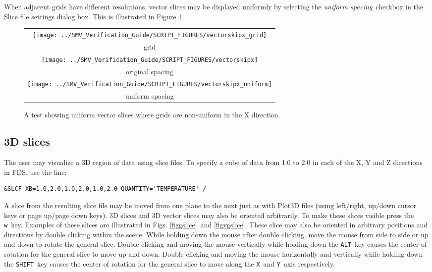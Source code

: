 \documentclass[11pt,twoside]{book}
\begin{document}
When adjacent grids have different resolutions, vector slices may be displayed uniformly
by selecting the {\em uniform spacing}\ checkbox in the Slice file settings dialog box.
This is illustrated in Figure \ref{figvsliceuniformx}.

\begin{figure}[bph]
\begin{center}
\begin{tabular}{c}
 \texttt{[image: ../SMV\_Verification\_Guide/SCRIPT\_FIGURES/vectorskipx\_grid]}\\
 grid\\
 \texttt{[image: ../SMV\_Verification\_Guide/SCRIPT\_FIGURES/vectorskipx]}\\
 original spacing\\
 \texttt{[image: ../SMV\_Verification\_Guide/SCRIPT\_FIGURES/vectorskipx\_uniform]}\\
 uniform spacing
 \end{tabular}
\end{center}
 \caption[A test showing uniform vector slices where grids are non-uniform in the X direction.]
{A test showing uniform vector slices where grids are non-uniform in the X direction.}
\label{figvsliceuniformx}%
\end{figure}


\subsection{3D slices}
The user may visualize a 3D region of data using slice files.
To specify a cube of data from 1.0 to 2.0 in each
of the X, Y and Z directions in FDS, use the line:
\begin{lstlisting}
&SLCF XB=1.0,2.0,1.0,2.0,1.0,2.0 QUANTITY='TEMPERATURE' /
\end{lstlisting}

A slice from the resulting slice file
may be moved from one plane to the next just as with Plot3D
files (using left/right, up/down cursor keys or page up/page down
keys).  3D slices and 3D vector slices may also be oriented arbitrarily.
To make these slices visible press the {\tt w}\ key.  Examples of
these slices are illustrated in Figs. \ref{figgslice}\ and \ref{figvgslice}.
These slice may also be oriented in arbitrary positions and directions by
double clicking within the scene.  While holding down the mouse after double clicking,
move the mouse from
side to side or up and down to rotate the general slice.  Double clicking and moving
the mouse vertically while holding down the {\tt ALT}\
key causes the center of rotation for the general slice to move up and down.
Double clicking and moving the mouse horizontally and vertically while holding down
the {\tt SHIFT}\ key causes the center of rotation for the general slice to move along
the {\tt X}\ and {\tt Y}\ axis respectively.
\end{document}
